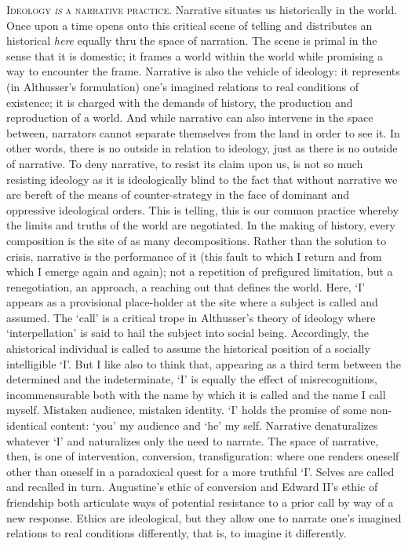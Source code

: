 \documentclass[
]{memoir}
\begin{document}
\textsc{Ideology \emph{is} a narrative practice}. Narrative situates us
historically in the world. Once upon a time opens onto this critical
scene of telling and distributes an historical \emph{here} equally thru
the space of narration. The scene is primal in the sense that it is
domestic; it frames a world within the world while promising a way to
encounter the frame. Narrative is also the vehicle of ideology: it
represents (in Althusser's formulation) one's imagined relations to real
conditions of existence; it is charged with the demands of history, the
production and reproduction of a world. And while narrative can also
intervene in the space between, narrators cannot separate themselves
from the land in order to see it. In other words, there is no outside in
relation to ideology, just as there is no outside of narrative. To deny
narrative, to resist its claim upon us, is not so much resisting
ideology as it is ideologically blind to the fact that without narrative
we are bereft of the means of counter-strategy in the face of dominant
and oppressive ideological orders. This is telling, this is our common
practice whereby the limits and truths of the world are negotiated. In
the making of history, every composition is the site of as many
decompositions. Rather than the solution to crisis, narrative is the
performance of it (this fault to which I return and from which I emerge
again and again); not a repetition of prefigured limitation, but a
renegotiation, an approach, a reaching out that defines the world. Here,
`I' appears as a provisional place-holder at the site where a subject is
called and assumed. The `call' is a critical trope in Althusser's theory
of ideology where `interpellation' is said to hail the subject into
social being. Accordingly, the ahistorical individual is called to
assume the historical position of a socially intelligible `I'. But I
like also to think that, appearing as a third term between the
determined and the indeterminate, `I' is equally the effect of
misrecognitions, incommensurable both with the name by which it is
called and the name I call myself. Mistaken audience, mistaken identity.
`I' holds the promise of some non-identical content: `you' my audience
and `he' my self. Narrative denaturalizes whatever `I' and naturalizes
only the need to narrate. The space of narrative, then, is one of
intervention, conversion, transfiguration: where one renders oneself
other than oneself in a paradoxical quest for a more truthful `I'.
Selves are called and recalled in turn. Augustine's ethic of conversion
and Edward II's ethic of friendship both articulate ways of potential
resistance to a prior call by way of a new response. Ethics are
ideological, but they allow one to narrate one's imagined relations to
real conditions differently, that is, to imagine it differently.
\end{document}
